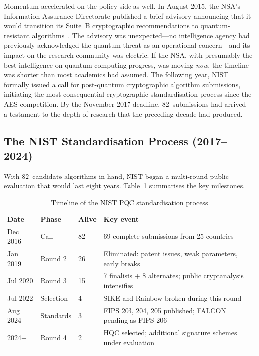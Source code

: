 Momentum accelerated on the policy side as well.  In August 2015, the NSA's Information Assurance Directorate published a brief advisory announcing that it would transition its Suite~B cryptographic recommendations to quantum-resistant algorithms~\cite{CNSA2.0}.  The advisory was unexpected---no intelligence agency had previously acknowledged the quantum threat as an operational concern---and its impact on the research community was electric.  If the NSA, with presumably the best intelligence on quantum-computing progress, was moving \emph{now}, the timeline was shorter than most academics had assumed.  The following year, NIST formally issued a call for post-quantum cryptographic algorithm submissions, initiating the most consequential cryptographic standardisation process since the AES competition.  By the November 2017 deadline, 82~submissions had arrived---a testament to the depth of research that the preceding decade had produced.

\subsection{The NIST Standardisation Process (2017--2024)}

With 82~candidate algorithms in hand, NIST began a multi-round public evaluation that would last eight years.  Table~\ref{tab:nist-timeline} summarises the key milestones.

\begin{table}[t]
\caption{Timeline of the NIST PQC standardisation process}
\label{tab:nist-timeline}
\begin{tabular}{p{1.8cm}p{1.8cm}p{1.5cm}p{5.5cm}}
\hline\noalign{\smallskip}
\textbf{Date} & \textbf{Phase} & \textbf{Alive} & \textbf{Key event} \\
\noalign{\smallskip}\svhline\noalign{\smallskip}
Dec 2016 & Call      & 82 & 69 complete submissions from 25 countries \\
Jan 2019 & Round 2   & 26 & Eliminated: patent issues, weak parameters, early breaks \\
Jul 2020 & Round 3   & 15 & 7 finalists + 8 alternates; public cryptanalysis intensifies \\
Jul 2022 & Selection & 4  & SIKE and Rainbow broken during this round \\
Aug 2024 & Standards & 3  & FIPS 203, 204, 205 published; FALCON pending as FIPS 206 \\
2024+    & Round 4   & 2  & HQC selected; additional signature schemes under evaluation \\
\noalign{\smallskip}\hline
\end{tabular}
\end{table}

